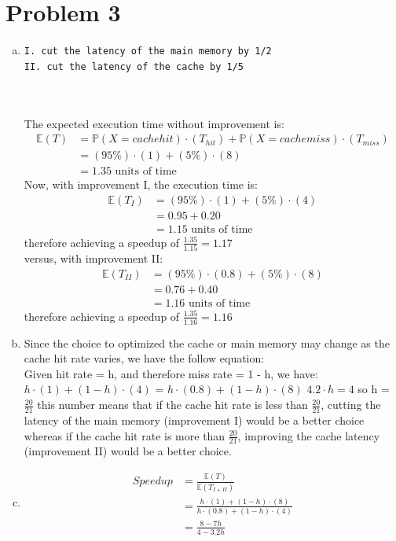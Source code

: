\documentclass{article}   	                         %
\begin{document}
\section*{Problem 3}
\begin{enumerate}[(a)]
\item
\begin{BVerbatim}
I. cut the latency of the main memory by 1/2
II. cut the latency of the cache by 1/5
\end{BVerbatim}
\\
\\
The expected execution time without improvement is:
\begin{align*}
 \mathds{E}(T)
 & = \mathds{P}(X = cache hit)\cdot (T_{hit}) +  \mathds{P}(X = cache miss)\cdot (T_{miss}) 
 \\& = (95\%)\cdot(1) + (5\%)\cdot(8)
 \\& = 1.35 \text {  units of time}
\end{align*}
Now, with improvement I, the execution time is:
\begin{align*}
 \mathds{E}(T_{I})
& = (95\%)\cdot(1) + (5\%)\cdot(4)
 \\& = 0.95 + 0.20
 \\& = 1.15 \text {  units of time}
\end{align*}
therefore achieving a speedup of $\frac{1.35}{1.15} = 1.17$
\\
versus, with improvement II:
\begin{align*}
 \mathds{E}(T_{II})
& = (95\%)\cdot(0.8) + (5\%)\cdot(8)
 \\& = 0.76 + 0.40
 \\& = 1.16 \text {  units of time}
\end{align*}
therefore achieving a speedup of $\frac{1.35}{1.16} = 1.16$\\
\item
Since the choice to optimized the cache or main memory may change as the cache hit rate varies, we have the follow equation:\\
Given hit rate = h, and therefore miss rate = 1 - h, we have:
$h\cdot(1) +  (1 - h)\cdot (4)$ = $h\cdot(0.8) + (1 - h)\cdot (8)$
$4.2\cdot h = 4$
so h = $\frac{20}{21}$
this number means that if the cache hit rate is less than $\frac{20}{21}$, cutting the latency of the main memory (improvement I) would be a better choice whereas if the cache hit rate is more than $\frac{20}{21}$, improving the cache latency (improvement II) would be a better choice.\\
\item
\begin{align*}
 Speedup
 & = \frac{\mathds{E}(T)}{\mathds{E}(T_{I + II})}
 \\& = \frac{h\cdot (1) + (1 - h)\cdot (8)}{h\cdot (0.8) + (1 - h)\cdot (4)}
 \\& = \frac{8 -7h}{4 - 3.2h}
\end{align*}
\end{enumerate}
\end{document}
